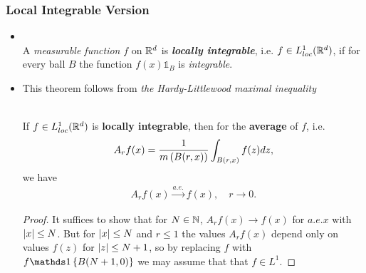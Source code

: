 \documentclass[11pt]{article}
\begin{document}
\subsubsection{Local Integrable Version}
\begin{itemize}
\item \begin{definition}\citep{stein2009real}\\
A \emph{measurable function} $f$ on ${\mathbb R}^{d}$ is \emph{\textbf{locally integrable}}, i.e. $f\in L_{loc}^{1}({\mathbb R}^{d})$, if for every ball $B$ the function $f(x)\mathds{1}_{B}$ is \emph{integrable}. 
\end{definition}

\item This theorem follows from \emph{the Hardy-Littlewood maximal inequality}
\begin{theorem}  \citep{stein2009real}\\
If $f\in L_{loc}^{1}({\mathbb R}^{d})$ is \textbf{locally integrable}, then for the \textbf{average} of $f$, i.e. 
\begin{align*}
A_{r}f(x)&=\frac{1}{m\left(B(r,x)\right)}\int_{B(r,x)}f(z)dz,\\
\end{align*} we have
\begin{align*}
A_{r}f(x) \stackrel{a.e.}{\rightarrow} f(x), \quad r\rightarrow 0. 
\end{align*}
\end{theorem}
\begin{proof}
It suffices to show that for $N\in {\mathbb N}$, $A_{r}f(x)  \rightarrow f(x)$ for $a.e. x$ with $\left\lvert x \right\rvert\le N$. But for $\left\lvert x \right\rvert\le N$ and $r\le 1$ the values $A_{r}f(x)$ depend only on values $f(z)$ for $\left\lvert z \right\rvert \le N+1$, so by replacing $f$ with $f\ind{B(N+1, 0)}$ we may assume that that $f\in L^{1}$.


\end{proof}
\end{itemize}
\end{document}
